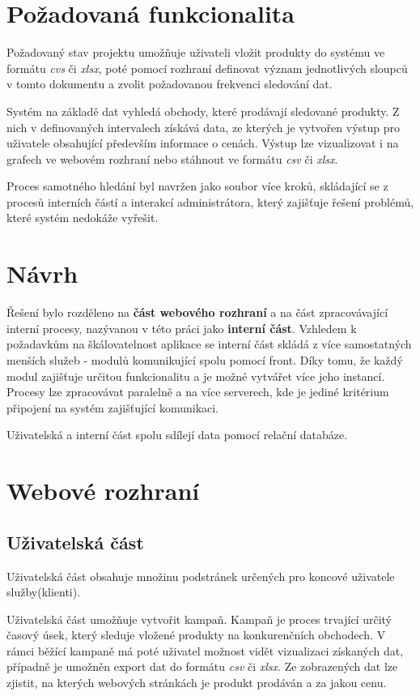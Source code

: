 \documentclass[thesis=B,czech]{FITthesis}[2012/06/26]
\begin{document}
\section{Požadovaná funkcionalita}
Požadovaný stav projektu umožňuje uživateli vložit produkty do systému ve formátu \textit{cvs} či \textit{xlsx}, poté pomocí
rozhraní definovat význam jednotlivých sloupců v tomto dokumentu a zvolit požadovanou frekvenci sledování dat.
\par
Systém na základě dat vyhledá obchody, které prodávají sledované produkty. Z nich v definovaných intervalech získává data, ze kterých je vytvořen výstup pro uživatele obsahující především informace o cenách. Výstup lze vizualizovat i na grafech ve webovém rozhraní nebo stáhnout ve formátu
\textit{csv} či \textit{xlsx}.
\par
Proces samotného hledání byl navržen jako soubor více kroků, skládající se z procesů interních částí a interakcí administrátora, který zajišťuje
řešení problémů, které systém nedokáže vyřešit.

\section{Návrh}
Řešení bylo rozděleno na \textbf{část webového rozhraní} a na část zpracovávající interní procesy, nazývanou v této práci 
jako \textbf{interní část}.
Vzhledem k požadavkům na škálovatelnost aplikace se interní část skládá z více samostatných menších služeb - modulů komunikující
spolu pomocí front. Díky tomu, že každý modul zajišťuje určitou funkcionalitu a je možné vytvářet více jeho instancí. Procesy lze 
zpracovávat paralelně a na více serverech, kde je jediné kritérium připojení na systém zajišťující komunikaci.
\par
Uživatelská a interní část spolu sdílejí data pomocí relační databáze\cite{DB}.

\section{Webové rozhraní}

\subsection{Uživatelská část}\label{ch:analysis-front-end}
Uživatelská část obsahuje množinu podstránek určených pro koncové uživatele
služby(klienti).
\par
Uživatelská část umožňuje vytvořit kampaň. Kampaň je proces trvající určitý časový úsek, který sleduje vložené produkty na konkurenčních
obchodech.
V rámci běžící kampaně má poté uživatel možnost vidět vizualizaci získaných dat, případně je umožněn export dat do formátu
\textit{csv} či \textit{xlsx}. Ze zobrazených dat lze zjistit, na kterých webových stránkách je produkt prodáván a za jakou cenu.
\end{document}
